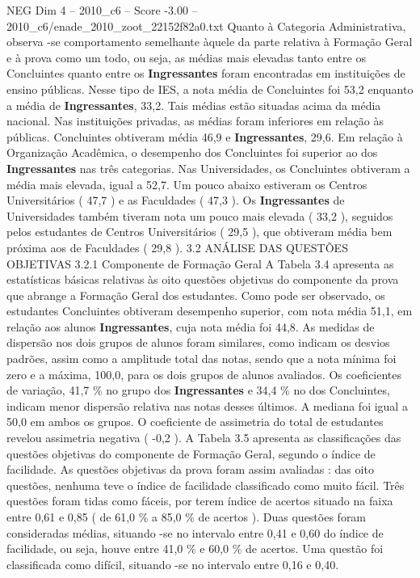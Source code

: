 \begin{textsample}{NEG Dim 4 – 2010\_c6 – Score -3.00 – 2010\_c6/enade\_2010\_zoot\_22152f82a0.txt}
Quanto à Categoria Administrativa, observa -se comportamento semelhante àquele da parte relativa à Formação Geral e à prova como um todo, ou seja, as médias mais elevadas tanto entre os Concluintes quanto entre os \textbf{Ingressantes} foram encontradas em instituições de ensino públicas.
Nesse tipo de IES, a nota média de Concluintes foi 53,2 enquanto a média de \textbf{Ingressantes}, 33,2.
Tais médias estão situadas acima da média nacional.
Nas instituições privadas, as médias foram inferiores em relação às públicas.
Concluintes obtiveram média 46,9 e \textbf{Ingressantes}, 29,6.
Em relação à Organização Acadêmica, o desempenho dos Concluintes foi superior ao dos \textbf{Ingressantes} nas três categorias.
Nas Universidades, os Concluintes obtiveram a média mais elevada, igual a 52,7.
Um pouco abaixo estiveram os Centros Universitários ( 47,7 ) e as Faculdades ( 47,3 ).
Os \textbf{Ingressantes} de Universidades também tiveram nota um pouco mais elevada ( 33,2 ), seguidos pelos estudantes de Centros Universitários ( 29,5 ), que obtiveram média bem próxima aos de Faculdades ( 29,8 ). 3.2 ANÁLISE DAS QUESTÕES OBJETIVAS 3.2.1 Componente de Formação Geral A Tabela 3.4 apresenta as estatísticas básicas relativas às oito questões objetivas do componente da prova que abrange a Formação Geral dos estudantes.
Como pode ser observado, os estudantes Concluintes obtiveram desempenho superior, com nota média 51,1, em relação aos alunos \textbf{Ingressantes}, cuja nota média foi 44,8.
As medidas de dispersão nos dois grupos de alunos foram similares, como indicam os desvios padrões, assim como a amplitude total das notas, sendo que a nota mínima foi zero e a máxima, 100,0, para os dois grupos de alunos avaliados.
Os coeficientes de variação, 41,7 \% no grupo dos \textbf{Ingressantes} e 34,4 \% no dos Concluintes, indicam menor dispersão relativa nas notas desses últimos.
A mediana foi igual a 50,0 em ambos os grupos.
O coeficiente de assimetria do total de estudantes revelou assimetria negativa ( -0,2 ).
A Tabela 3.5 apresenta as classificações das questões objetivas do componente de Formação Geral, segundo o índice de facilidade.
As questões objetivas da prova foram assim avaliadas : das oito questões, nenhuma teve o índice de facilidade classificado como muito fácil.
Três questões foram tidas como fáceis, por terem índice de acertos situado na faixa entre 0,61 e 0,85 ( de 61,0 \% a 85,0 \% de acertos ).
Duas questões foram consideradas médias, situando -se no intervalo entre 0,41 e 0,60 do índice de facilidade, ou seja, houve entre 41,0 \% e 60,0 \% de acertos.
Uma questão foi classificada como difícil, situando -se no intervalo entre 0,16 e 0,40.

\end{textsample}
